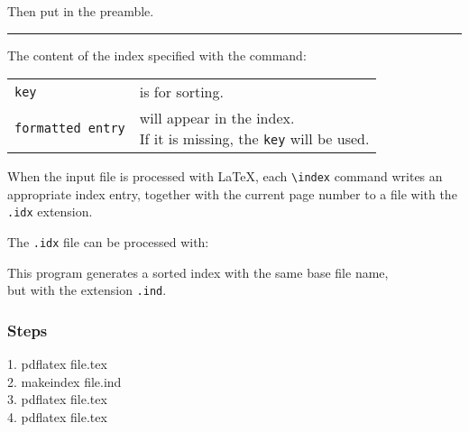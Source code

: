 \documentclass[a4paper]{article}
\begin{document}
\rule{0em}{2ex}


\rule{0em}{2ex}

Then put  in the preamble.

\rule{0em}{2ex}

\rule{\textwidth}{0.5pt}

\rule{0em}{2ex}

The content of the index specified with the command:

\rule{0em}{2ex}


\rule{0em}{2ex}

\begin{tabular}{l @{~~~~~~~~} l}
\verb|key|                  &       is for sorting.\\
\verb|formatted entry|      &       \parbox[t]{8cm}{%
will appear in the index.\\
If it is missing, the \texttt{key} will be used.}
\end{tabular}

\rule{0em}{2ex}

When the input file is processed with \LaTeX{},
each \verb|\index| command writes an appropriate index entry,
together with the current page number to a file with the \verb|.idx| extension.

\rule{0em}{2ex}

The \verb|.idx| file can be processed with:

\rule{0em}{2ex}


\rule{0em}{2ex}

This program generates a sorted index with the same base file name,\\
but with the \mbox{extension} \verb|.ind|.

\rule{0em}{2ex}

\begin{center}
\end{center}

\subsubsection*{Steps}
1. pdflatex file.tex\\
2. makeindex file.ind\\
3. pdflatex file.tex\\
4. pdflatex file.tex
\end{document}
